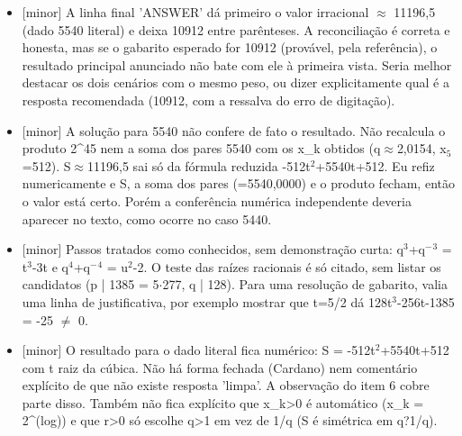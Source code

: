 \documentclass{article}%
\begin{document}
\begin{itemize}%
\item%
{[}minor{]} A linha final 'ANSWER' dá primeiro o valor irracional $\approx$ 11196,5 (dado 5540 literal) e deixa 10912 entre parênteses. A reconciliação é correta e honesta, mas se o gabarito esperado for 10912 (provável, pela referência), o resultado principal anunciado não bate com ele à primeira vista. Seria melhor destacar os dois cenários com o mesmo peso, ou dizer explicitamente qual é a resposta recomendada (10912, com a ressalva do erro de digitação).%
\item%
{[}minor{]} A solução para 5540 não confere de fato o resultado. Não recalcula o produto 2\^{}45 nem a soma dos pares 5540 com os x\_k obtidos (q$\approx$2,0154, x$_{5}$=512). S$\approx$11196,5 sai só da fórmula reduzida -512t$^2$+5540t+512. Eu refiz numericamente e S, a soma dos pares (=5540,0000) e o produto fecham, então o valor está certo. Porém a conferência numérica independente deveria aparecer no texto, como ocorre no caso 5440.%
\item%
{[}minor{]} Passos tratados como conhecidos, sem demonstração curta: q$^3$+q$^{-}$$^3$ = t$^3$-3t e q$^{4}$+q$^{-}$$^{4}$ = u$^2$-2. O teste das raízes racionais é só citado, sem listar os candidatos (p | 1385 = 5$\cdot$277, q | 128). Para uma resolução de gabarito, valia uma linha de justificativa, por exemplo mostrar que t=5/2 dá 128t$^3$-256t-1385 = -25 $\neq$ 0.%
\item%
{[}minor{]} O resultado para o dado literal fica numérico: S = -512t$^2$+5540t+512 com t raiz da cúbica. Não há forma fechada (Cardano) nem comentário explícito de que não existe resposta 'limpa'. A observação do item 6 cobre parte disso. Também não fica explícito que x\_k>0 é automático (x\_k = 2\^{}(log)) e que r>0 só escolhe q>1 em vez de 1/q (S é simétrica em q?1/q).%
\end{itemize}%
\end{document}
